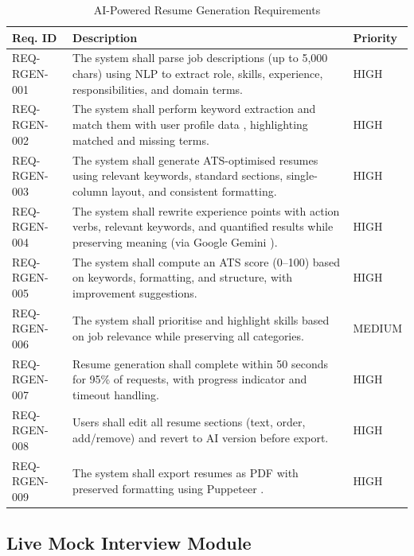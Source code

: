 \documentclass[12pt, a4paper, oneside]{report}
\begin{document}
\begin{table}[H]
\centering
\caption{AI-Powered Resume Generation Requirements}
\label{tab:req_rgen}
\renewcommand{\arraystretch}{1.2}
\small
\begin{tabularx}{\textwidth}{|p{3cm}|X|p{2cm}|}
\hline
\textbf{Req. ID} & \textbf{Description} & \textbf{Priority} \\
\hline
REQ-RGEN-001 & The system shall parse job descriptions (up to 5,000 chars) using NLP \cite{vaswani2017} to extract role, skills, experience, responsibilities, and domain terms. & HIGH \\
\hline
REQ-RGEN-002 & The system shall perform keyword extraction and match them with user profile data \cite{devlin2019}, highlighting matched and missing terms. & HIGH \\
\hline
REQ-RGEN-003 & The system shall generate ATS-optimised resumes \cite{jobscan2021} using relevant keywords, standard sections, single-column layout, and consistent formatting. & HIGH \\
\hline
REQ-RGEN-004 & The system shall rewrite experience points with action verbs, relevant keywords, and quantified results while preserving meaning (via Google Gemini \cite{gemini2023}). & HIGH \\
\hline
REQ-RGEN-005 & The system shall compute an ATS score (0--100) based on keywords, formatting, and structure, with improvement suggestions. & HIGH \\
\hline
REQ-RGEN-006 & The system shall prioritise and highlight skills based on job relevance while preserving all categories. & MEDIUM \\
\hline
REQ-RGEN-007 & Resume generation shall complete within 50 seconds for 95\% of requests, with progress indicator and timeout handling. & HIGH \\
\hline
REQ-RGEN-008 & Users shall edit all resume sections (text, order, add/remove) and revert to AI version before export. & HIGH \\
\hline
REQ-RGEN-009 & The system shall export resumes as PDF with preserved formatting using Puppeteer \cite{puppeteer2024}. & HIGH \\
\hline
\end{tabularx}
\end{table}

\subsection{Live Mock Interview Module}
\end{document}

